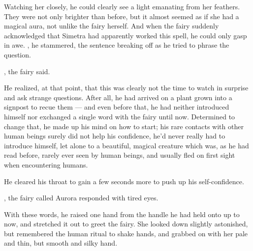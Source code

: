 Watching her closely, he could clearly see a light emanating from her feathers. They were not only brighter than before, but it almost seemed as if she had a magical aura, not unlike the fairy herself. And when the fairy suddenly acknowledged that Simetra had apparently worked this spell, he could only gasp in awe. , he stammered, the sentence breaking off as he tried to phrase the question.

, the fairy said. 

He realized, at that point, that this was clearly not the time to watch in surprise and ask strange questions. After all, he had arrived on a plant grown into a signpost to recue them --- and even before that, he had neither introduced himself nor exchanged a single word with the fairy until now. Determined to change that, he made up his mind on how to start; his rare contacts with other human beings surely did not help his confidence, he'd never really had to introduce himself, let alone to a beautiful, magical creature which was, as he had read before, rarely ever seen by human beings, and usually fled on first sight when encountering humans.

He cleared his throat to gain a few seconds more to push up his self-confidence. 

, the fairy called Aurora responded with tired eyes.

 With these words, he raised one hand from the handle he had held onto up to now, and stretched it out to greet the fairy. She looked down slightly astonished, but remembered the human ritual to shake hands, and grabbed on with her pale and thin, but smooth and silky hand.


